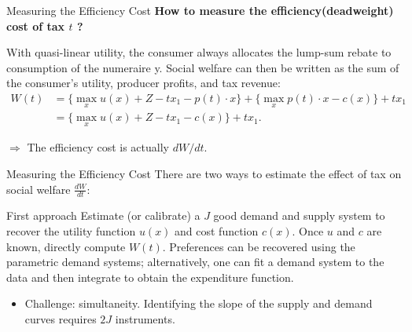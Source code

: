 \documentclass{beamer}
\begin{document}
\begin{frame}{Measuring the Efficiency Cost}
	\textbf{How to measure the efficiency(deadweight) cost of tax $t$ ?}
	\medskip

	With quasi-linear utility, the consumer always allocates the lump-sum rebate to consumption of the numeraire y. Social welfare can then be written as the sum of the consumer’s utility, producer profits, and tax revenue:
	\begin{equation}\label{welfare}
		\begin{aligned}
			W(t) &= \{\max_x u(x) + Z - tx_1 - p(t)\cdot x \} + \{\max_x p(t)\cdot x - c(x)\} + tx_1 \\
			&= \{\max_x u(x) + Z - tx_1 - c(x)\} + tx_1.
		\end{aligned}
	\end{equation}

	$\Rightarrow$ The efficiency cost is actually $dW/dt$.
\end{frame}
\begin{frame}{Measuring the Efficiency Cost}
	There are two ways to estimate the effect of tax on social welfare $\frac{dW}{dt}$:
	\begin{block}{First approach}
		Estimate (or calibrate) a $J$ good demand and supply system to recover the utility function $u(x)$ and cost function $c(x)$. Once $u$ and $c$ are known, directly compute $W(t)$. Preferences can be recovered using the parametric demand systems; alternatively, one can fit a demand system to the data and then integrate to obtain the expenditure function.
		\begin{itemize}
			\item Challenge: simultaneity. Identifying the slope of the supply and demand curves requires $2J$ instruments.
		\end{itemize}
	\end{block}
\end{frame}
\end{document}
